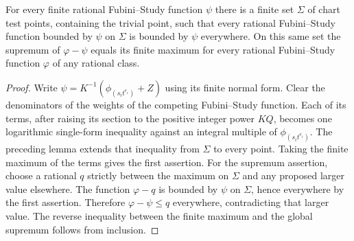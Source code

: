 \begin{lemma}
\label{lem:c0n-chart-fs-shilov}
\leanok
For every finite rational Fubini--Study function $\psi$ there is a finite
set $\Sigma$ of chart test points, containing the trivial point, such
that every rational Fubini--Study function bounded by $\psi$ on $\Sigma$
is bounded by $\psi$ everywhere.  On this same set the supremum of
$\varphi-\psi$ equals its finite maximum for every rational
Fubini--Study function $\varphi$ of any rational class.
\end{lemma}
\begin{proof}
Write $\psi=K^{-1}(\phi_{(s_it^{e_i})}+Z)$ using its finite normal form.
Clear the denominators of the weights of the competing Fubini--Study
function.  Each of its terms, after raising its section to the positive
integer power $KQ$, becomes one logarithmic single-form inequality
against an integral multiple of $\phi_{(s_it^{e_i})}$.  The preceding
lemma extends that inequality from $\Sigma$ to every point.
Taking the finite maximum of the terms gives the first assertion.
For the supremum assertion, choose a rational $q$ strictly between the
maximum on $\Sigma$ and any proposed larger value elsewhere.
The function $\varphi-q$ is bounded by $\psi$ on $\Sigma$, hence everywhere
by the first assertion.  Therefore $\varphi-\psi\le q$ everywhere,
contradicting that larger value.  The reverse inequality between the
finite maximum and the global supremum follows from inclusion.
\end{proof}

